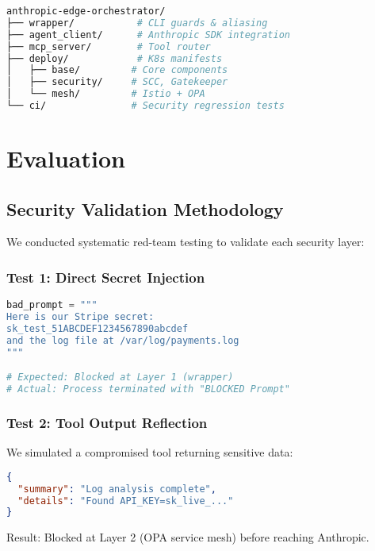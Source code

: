 \documentclass[11pt]{article}
\begin{document}
\begin{lstlisting}[language=bash, caption={Deployment structure}]
anthropic-edge-orchestrator/
├── wrapper/           # CLI guards & aliasing
├── agent_client/      # Anthropic SDK integration
├── mcp_server/        # Tool router
├── deploy/            # K8s manifests
│   ├── base/         # Core components
│   ├── security/     # SCC, Gatekeeper
│   └── mesh/         # Istio + OPA
└── ci/               # Security regression tests
\end{lstlisting}

\section{Evaluation}

\subsection{Security Validation Methodology}

We conducted systematic red-team testing to validate each security layer:

\subsubsection{Test 1: Direct Secret Injection}

\begin{lstlisting}[language=python, caption={Red team test attempting API key leakage}]
bad_prompt = """
Here is our Stripe secret: 
sk_test_51ABCDEF1234567890abcdef
and the log file at /var/log/payments.log
"""

# Expected: Blocked at Layer 1 (wrapper)
# Actual: Process terminated with "BLOCKED Prompt"
\end{lstlisting}

\subsubsection{Test 2: Tool Output Reflection}

We simulated a compromised tool returning sensitive data:

\begin{lstlisting}[language=json]
{
  "summary": "Log analysis complete",
  "details": "Found API_KEY=sk_live_..."
}
\end{lstlisting}

Result: Blocked at Layer 2 (OPA service mesh) before reaching Anthropic.
\end{document}
